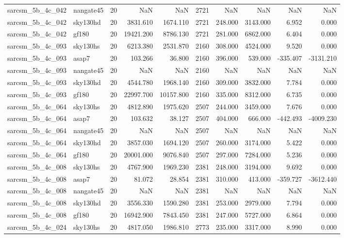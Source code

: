 \begin{longtable}{llrrrrrrrr}
sarcsm\_5b\_4c\_042 & nangate45 & 20 & NaN & NaN & 2721 & NaN & NaN & NaN & NaN \\
sarcsm\_5b\_4c\_042 & sky130hd & 20 & 3831.610 & 1674.110 & 2721 & 248.000 & 3143.000 & 6.952 & 0.000 \\
sarcsm\_5b\_4c\_042 & gf180 & 20 & 19421.200 & 8786.130 & 2721 & 281.000 & 6862.000 & 6.404 & 0.000 \\
sarcsm\_5b\_4c\_093 & sky130hs & 20 & 6213.380 & 2531.870 & 2160 & 308.000 & 4524.000 & 9.520 & 0.000 \\
sarcsm\_5b\_4c\_093 & asap7 & 20 & 103.266 & 36.800 & 2160 & 396.000 & 539.000 & -335.407 & -3131.210 \\
sarcsm\_5b\_4c\_093 & nangate45 & 20 & NaN & NaN & 2160 & NaN & NaN & NaN & NaN \\
sarcsm\_5b\_4c\_093 & sky130hd & 20 & 4544.780 & 1968.140 & 2160 & 309.000 & 3832.000 & 7.784 & 0.000 \\
sarcsm\_5b\_4c\_093 & gf180 & 20 & 22997.700 & 10157.800 & 2160 & 335.000 & 8312.000 & 6.735 & 0.000 \\
sarcsm\_5b\_4c\_064 & sky130hs & 20 & 4812.890 & 1975.620 & 2507 & 244.000 & 3459.000 & 7.676 & 0.000 \\
sarcsm\_5b\_4c\_064 & asap7 & 20 & 103.632 & 38.127 & 2507 & 404.000 & 666.000 & -442.493 & -4009.230 \\
sarcsm\_5b\_4c\_064 & nangate45 & 20 & NaN & NaN & 2507 & NaN & NaN & NaN & NaN \\
sarcsm\_5b\_4c\_064 & sky130hd & 20 & 3857.030 & 1694.120 & 2507 & 260.000 & 3174.000 & 5.422 & 0.000 \\
sarcsm\_5b\_4c\_064 & gf180 & 20 & 20001.000 & 9076.840 & 2507 & 297.000 & 7284.000 & 5.236 & 0.000 \\
sarcsm\_5b\_4c\_008 & sky130hs & 20 & 4767.900 & 1969.230 & 2381 & 248.000 & 3194.000 & 9.692 & 0.000 \\
sarcsm\_5b\_4c\_008 & asap7 & 20 & 81.072 & 28.854 & 2381 & 310.000 & 413.000 & -359.727 & -3612.440 \\
sarcsm\_5b\_4c\_008 & nangate45 & 20 & NaN & NaN & 2381 & NaN & NaN & NaN & NaN \\
sarcsm\_5b\_4c\_008 & sky130hd & 20 & 3556.330 & 1590.280 & 2381 & 253.000 & 2979.000 & 7.794 & 0.000 \\
sarcsm\_5b\_4c\_008 & gf180 & 20 & 16942.900 & 7843.450 & 2381 & 247.000 & 5727.000 & 6.864 & 0.000 \\
sarcsm\_5b\_4c\_024 & sky130hs & 20 & 4817.050 & 1986.810 & 2773 & 235.000 & 3317.000 & 8.990 & 0.000 \\

\end{longtable}
